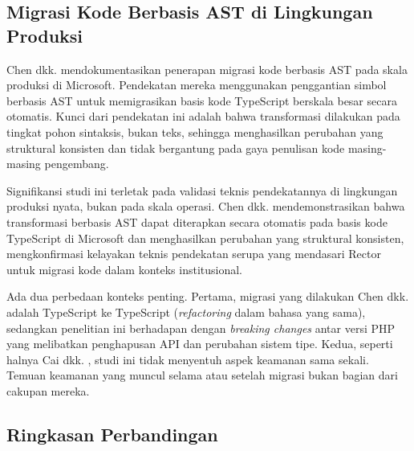   \subsection{Migrasi Kode Berbasis AST di Lingkungan Produksi}

    Chen dkk. \cite{chen2022ast} mendokumentasikan penerapan migrasi kode berbasis AST pada skala produksi di Microsoft. Pendekatan mereka menggunakan penggantian simbol berbasis AST untuk memigrasikan basis kode TypeScript berskala besar secara otomatis. Kunci dari pendekatan ini adalah bahwa transformasi dilakukan pada tingkat pohon sintaksis, bukan teks, sehingga menghasilkan perubahan yang struktural konsisten dan tidak bergantung pada gaya penulisan kode masing-masing pengembang.

    Signifikansi studi ini terletak pada validasi teknis pendekatannya di lingkungan produksi nyata, bukan pada skala operasi. Chen dkk. mendemonstrasikan bahwa transformasi berbasis AST dapat diterapkan secara otomatis pada basis kode TypeScript di Microsoft dan menghasilkan perubahan yang struktural konsisten, mengkonfirmasi kelayakan teknis pendekatan serupa yang mendasari Rector untuk migrasi kode dalam konteks institusional.

    Ada dua perbedaan konteks penting. Pertama, migrasi yang dilakukan Chen dkk. adalah TypeScript ke TypeScript (\textit{refactoring} dalam bahasa yang sama), sedangkan penelitian ini berhadapan dengan \textit{breaking changes} antar versi PHP yang melibatkan penghapusan API dan perubahan sistem tipe. Kedua, seperti halnya Cai dkk. \cite{cai2015pattern}, studi ini tidak menyentuh aspek keamanan sama sekali. Temuan keamanan yang muncul selama atau setelah migrasi bukan bagian dari cakupan mereka.

    \subsection{Ringkasan Perbandingan}

